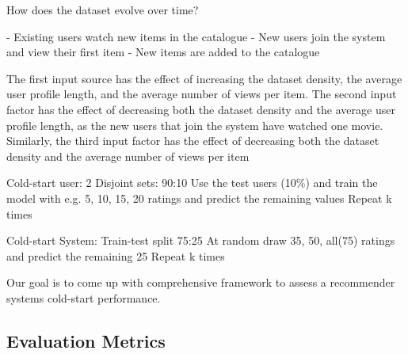 How does the dataset evolve over time?

	- Existing users watch new items in the catalogue
	- New users join the system and view their first item
	- New items are added to the catalogue

The first input source has the effect of increasing the dataset density, the average user profile length, and the
average number of views per item. The second input factor has the effect of decreasing both the dataset density
and the average user profile length, as the new users that join the system have watched one movie. Similarly,
the third input factor has the effect of decreasing both the dataset density and the average number of views per
item

Cold-start user:
2 Disjoint sets: 90:10
Use the test users (10\%) and train the model with e.g. 5, 10, 15, 20 ratings and predict the remaining values
Repeat k times


Cold-start System:
Train-test split 75:25
At random draw 35, 50, all(75) ratings and predict the remaining 25
Repeat k times


Our goal is to come up with comprehensive framework to assess a recommender systems cold-start performance.










\subsection{Evaluation Metrics}





